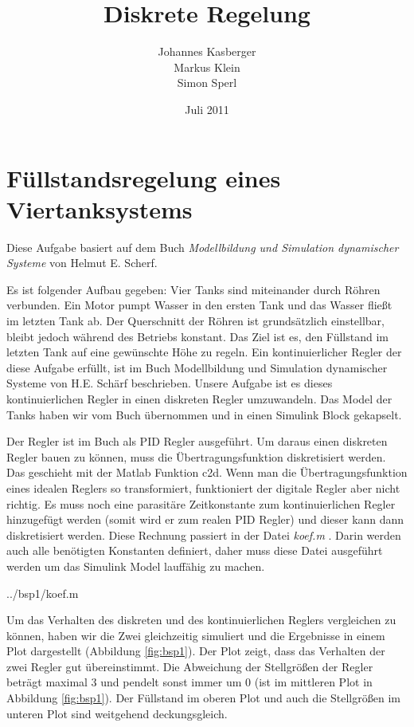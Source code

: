 \documentclass[a4paper]{article}
\title{Diskrete Regelung}
\author{Johannes Kasberger\\Markus Klein\\Simon Sperl}
\date{Juli 2011}
\begin{document}
\lstset{language=matlab}
\lstset{linewidth=120mm}
\lstset{frameround=tttt}

\maketitle

\section{Füllstandsregelung eines Viertanksystems}

Diese Aufgabe basiert auf dem Buch \emph{Modellbildung und Simulation dynamischer Systeme} von Helmut E. Scherf.

Es ist folgender Aufbau gegeben: Vier Tanks sind miteinander durch Röhren verbunden. Ein Motor pumpt Wasser in den ersten Tank und das Wasser fließt im letzten Tank ab. Der Querschnitt der Röhren ist grundsätzlich einstellbar, bleibt jedoch während des Betriebs konstant. Das Ziel ist es, den Füllstand im letzten Tank auf eine gewünschte Höhe zu regeln. Ein kontinuierlicher Regler der diese Aufgabe erfüllt, ist im Buch Modellbildung und Simulation dynamischer Systeme von H.E. Schärf beschrieben. Unsere Aufgabe ist es dieses kontinuierlichen Regler in einen diskreten Regler umzuwandeln. Das Model der Tanks haben wir vom Buch übernommen und in einen Simulink Block gekapselt. 

Der Regler ist im Buch als PID Regler ausgeführt. Um daraus einen diskreten Regler bauen zu können, muss die Übertragungsfunktion diskretisiert werden. Das geschieht mit der Matlab Funktion c2d. Wenn man die Übertragungsfunktion eines idealen Reglers so transformiert, funktioniert der digitale Regler aber nicht richtig. Es muss noch eine parasitäre Zeitkonstante zum kontinuierlichen Regler hinzugefügt werden (somit wird er zum realen PID Regler) und dieser kann dann diskretisiert werden. Diese Rechnung passiert in der Datei \emph{koef.m }. Darin werden auch alle benötigten Konstanten definiert, daher muss diese Datei ausgeführt werden um das Simulink Model lauffähig zu machen. 

 {../bsp1/koef.m}

Um das Verhalten des diskreten und des kontinuierlichen Reglers vergleichen zu können, haben wir die Zwei gleichzeitig simuliert und die Ergebnisse in einem Plot dargestellt (Abbildung \ref{fig:bsp1}). Der Plot zeigt, dass das Verhalten der zwei Regler gut übereinstimmt. Die Abweichung der Stellgrößen der Regler beträgt maximal 3 und pendelt sonst immer um 0 (ist im mittleren Plot in Abbildung \ref{fig:bsp1}). Der Füllstand im oberen Plot und auch die Stellgrößen im unteren Plot sind weitgehend deckungsgleich.
\end{document}
